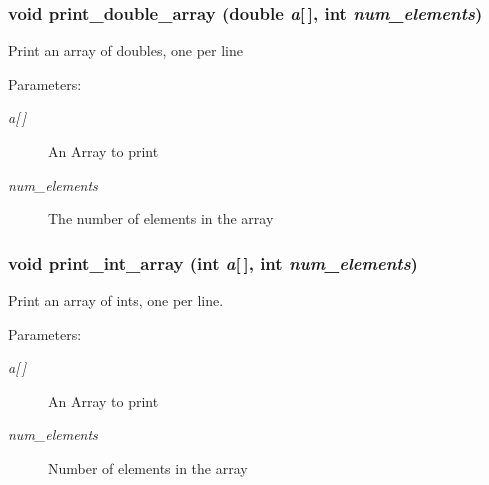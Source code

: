 \subsubsection{\setlength{\rightskip}{0pt plus 5cm}void print\_\-double\_\-array (double {\em a}[$\,$], int {\em num\_\-elements})}\label{print__arrays_8h_6c11f9531a38b3ced81f1556a72f9dcd}


Print an array of doubles, one per line \begin{Desc}
\item[Parameters:]
\begin{description}
\item[{\em a\mbox{[}$\,$\mbox{]}}]An Array to print \item[{\em num\_\-elements}]The number of elements in the array \end{description}
\end{Desc}
\subsubsection{\setlength{\rightskip}{0pt plus 5cm}void print\_\-int\_\-array (int {\em a}[$\,$], int {\em num\_\-elements})}\label{print__arrays_8h_a5e6807121f9ade71432e51859d75c92}


Print an array of ints, one per line. \begin{Desc}
\item[Parameters:]
\begin{description}
\item[{\em a\mbox{[}$\,$\mbox{]}}]An Array to print \item[{\em num\_\-elements}]Number of elements in the array \end{description}
\end{Desc}
